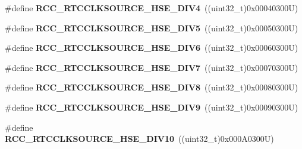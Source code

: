 \begin{DoxyCompactItemize}
\item 
\mbox{\label{group___r_c_c___r_t_c___clock___source_ga0f45ba0fe6a8f125137d3cee8b49f7cc}} 
\#define {\bfseries R\+C\+C\+\_\+\+R\+T\+C\+C\+L\+K\+S\+O\+U\+R\+C\+E\+\_\+\+H\+S\+E\+\_\+\+D\+I\+V4}~((uint32\+\_\+t)0x00040300\+U)
\item 
\mbox{\label{group___r_c_c___r_t_c___clock___source_ga229473454f04d994e1ed1751d6b19e48}} 
\#define {\bfseries R\+C\+C\+\_\+\+R\+T\+C\+C\+L\+K\+S\+O\+U\+R\+C\+E\+\_\+\+H\+S\+E\+\_\+\+D\+I\+V5}~((uint32\+\_\+t)0x00050300\+U)
\item 
\mbox{\label{group___r_c_c___r_t_c___clock___source_gae541538e57fdf779b8f16202416c799a}} 
\#define {\bfseries R\+C\+C\+\_\+\+R\+T\+C\+C\+L\+K\+S\+O\+U\+R\+C\+E\+\_\+\+H\+S\+E\+\_\+\+D\+I\+V6}~((uint32\+\_\+t)0x00060300\+U)
\item 
\mbox{\label{group___r_c_c___r_t_c___clock___source_ga352febcf0ae6b14407f0e6aae66ffe11}} 
\#define {\bfseries R\+C\+C\+\_\+\+R\+T\+C\+C\+L\+K\+S\+O\+U\+R\+C\+E\+\_\+\+H\+S\+E\+\_\+\+D\+I\+V7}~((uint32\+\_\+t)0x00070300\+U)
\item 
\mbox{\label{group___r_c_c___r_t_c___clock___source_gaf4f0209bbf068b427617f380e8e42490}} 
\#define {\bfseries R\+C\+C\+\_\+\+R\+T\+C\+C\+L\+K\+S\+O\+U\+R\+C\+E\+\_\+\+H\+S\+E\+\_\+\+D\+I\+V8}~((uint32\+\_\+t)0x00080300\+U)
\item 
\mbox{\label{group___r_c_c___r_t_c___clock___source_gafabded7bf1f0108152a9c2301fdbe251}} 
\#define {\bfseries R\+C\+C\+\_\+\+R\+T\+C\+C\+L\+K\+S\+O\+U\+R\+C\+E\+\_\+\+H\+S\+E\+\_\+\+D\+I\+V9}~((uint32\+\_\+t)0x00090300\+U)
\item 
\mbox{\label{group___r_c_c___r_t_c___clock___source_gab53e5fbbd7510563393fde77cfdde411}} 
\#define {\bfseries R\+C\+C\+\_\+\+R\+T\+C\+C\+L\+K\+S\+O\+U\+R\+C\+E\+\_\+\+H\+S\+E\+\_\+\+D\+I\+V10}~((uint32\+\_\+t)0x000\+A0300\+U)
\item 
\mbox{\label{group___r_c_c___r_t_c___clock___source_gae0ca4ffa1a26f99e377c56183ea68ec1}} 

\end{DoxyCompactItemize}
